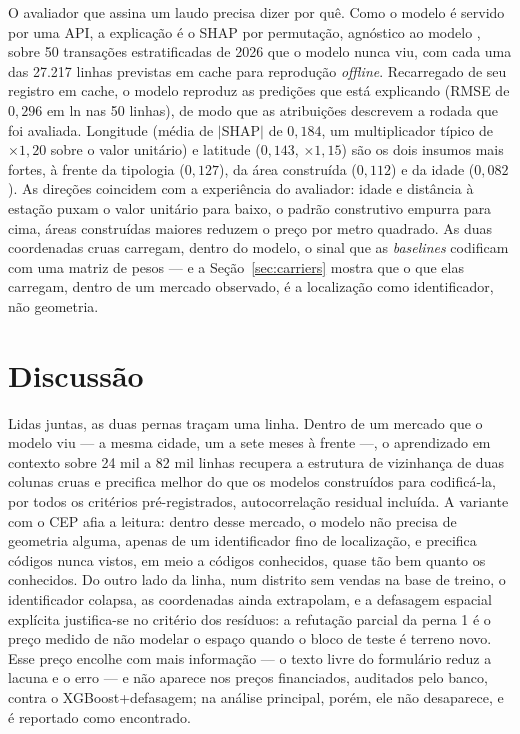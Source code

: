 \documentclass[11pt,a4paper]{article}
\begin{document}
O avaliador que assina um laudo precisa dizer por quê. Como o modelo é servido por uma API, a
explicação é o SHAP por permutação, agnóstico ao modelo \citep{lundberg2017shap}, sobre 50
transações estratificadas de 2026 que o modelo nunca viu, com cada uma das 27.217 linhas
previstas em cache para reprodução \emph{offline}. Recarregado de seu registro em cache, o
modelo reproduz as predições que está explicando (RMSE de $0{,}296$ em ln nas 50 linhas), de
modo que as atribuições descrevem a rodada que foi avaliada. Longitude (média de $|$SHAP$|$ de
$0{,}184$, um multiplicador típico de $\times 1{,}20$ sobre o valor unitário) e latitude
($0{,}143$, $\times 1{,}15$) são os dois insumos mais fortes, à frente da tipologia
($0{,}127$), da área construída ($0{,}112$) e da idade ($0{,}082$). As direções coincidem com a
experiência do avaliador: idade e distância à estação puxam o valor unitário para baixo, o
padrão construtivo empurra para cima, áreas construídas maiores reduzem o preço por metro
quadrado. As duas coordenadas cruas carregam, dentro do modelo, o sinal que as \emph{baselines}
codificam com uma matriz de pesos --- e a Seção~\ref{sec:carriers} mostra que o que elas
carregam, dentro de um mercado observado, é a localização como identificador, não geometria.

\section{Discussão}
\label{sec:discussion}

Lidas juntas, as duas pernas traçam uma linha. Dentro de um mercado que o modelo viu --- a
mesma cidade, um a sete meses à frente ---, o aprendizado em contexto sobre 24 mil a 82 mil
linhas recupera a estrutura de vizinhança de duas colunas cruas e precifica melhor do que os
modelos construídos para codificá-la, por todos os critérios pré-registrados, autocorrelação
residual incluída. A variante com o CEP afia a leitura: dentro desse mercado, o modelo não
precisa de geometria alguma, apenas de um identificador fino de localização, e precifica
códigos nunca vistos, em meio a códigos conhecidos, quase tão bem quanto os conhecidos. Do
outro lado da linha, num distrito sem vendas na base de treino, o identificador colapsa, as
coordenadas ainda extrapolam, e a defasagem espacial explícita justifica-se no critério
dos resíduos: a refutação parcial da perna 1 é o preço medido de não modelar o espaço quando o
bloco de teste é terreno novo. Esse preço encolhe com mais informação --- o texto livre do
formulário reduz a lacuna e o erro --- e não aparece nos preços financiados, auditados pelo
banco, contra o XGBoost+defasagem; na análise principal, porém, ele não desaparece, e é
reportado como encontrado.
\end{document}
